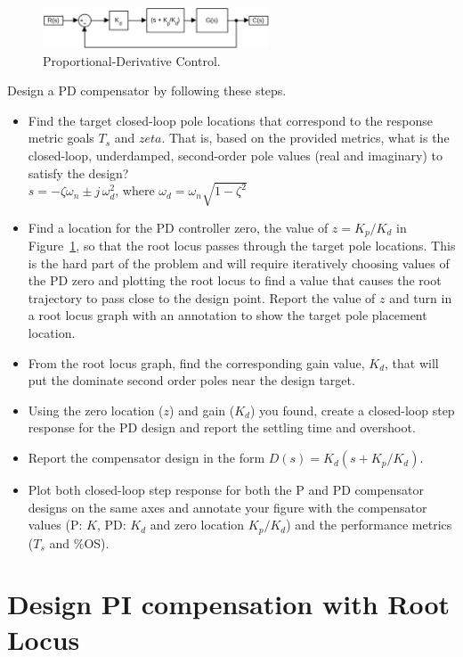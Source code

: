 \documentclass[11pt]{article}
\begin{document}
\begin{figure}[hbt!]
\centering  
\includegraphics [width=0.6\textwidth]{pd_control.png}
\caption{Proportional-Derivative Control.}
\label{f:pd}
\end{figure}

Design a PD compensator by following these steps.
\begin{itemize}
\item Find the target closed-loop pole locations that correspond to the response metric goals $T_s$ and $zeta$.  That is, based on the provided metrics, what is the closed-loop, underdamped, second-order pole values (real and imaginary) to satisfy the design?  \\
  $s = -\zeta \omega_n \pm j \,\omega_d^2$, where $\omega_d = \omega_n \sqrt{1-\zeta^2}$
\item Find a location for the PD controller zero, the value of $z = K_p/K_d$ in Figure~\ref{f:pd}, so that the root locus passes through the target pole locations.  This is the hard part of the problem and will require iteratively choosing values of the PD zero and plotting the root locus to find a value that causes the root trajectory to pass close to the design point.  Report the value of $z$ and turn in a root locus graph with an annotation to show the target pole placement location.
\item From the root locus graph, find the corresponding gain value, $K_d$, that will put the dominate second order poles near the design target.  
\item Using the zero location ($z$) and gain ($K_d$) you found, create a closed-loop step response for the PD design and report the settling time and overshoot.
\item Report the compensator design in the form $D(s) = K_d (s + K_p/K_d)$.
  \item Plot both closed-loop step response for both the P and PD compensator designs on the same axes and annotate your figure with the compensator values (P: $K$, PD: $K_d$ and zero location $K_p/K_d$) and the performance metrics ($T_s$ and \%OS).
\end{itemize}



\section{Design PI compensation with Root Locus}
\end{document}
